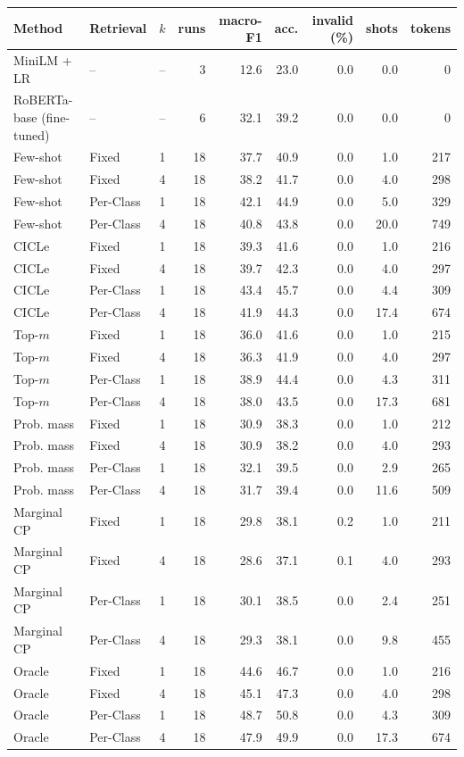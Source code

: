 \begin{tabular}{llrrrrrrr}
\toprule
Method & Retrieval & $k$ & runs & macro-F1 & acc. & invalid (\%) & shots & tokens \\
\midrule
MiniLM + LR & -- & -- & 3 & 12.6 & 23.0 & 0.0 & 0.0 & 0 \\
RoBERTa-base (fine-tuned) & -- & -- & 6 & 32.1 & 39.2 & 0.0 & 0.0 & 0 \\
\midrule
Few-shot & Fixed & 1 & 18 & 37.7 & 40.9 & 0.0 & 1.0 & 217 \\
Few-shot & Fixed & 4 & 18 & 38.2 & 41.7 & 0.0 & 4.0 & 298 \\
Few-shot & Per-Class & 1 & 18 & 42.1 & 44.9 & 0.0 & 5.0 & 329 \\
Few-shot & Per-Class & 4 & 18 & 40.8 & 43.8 & 0.0 & 20.0 & 749 \\
CICLe & Fixed & 1 & 18 & 39.3 & 41.6 & 0.0 & 1.0 & 216 \\
CICLe & Fixed & 4 & 18 & 39.7 & 42.3 & 0.0 & 4.0 & 297 \\
CICLe & Per-Class & 1 & 18 & 43.4 & 45.7 & 0.0 & 4.4 & 309 \\
CICLe & Per-Class & 4 & 18 & 41.9 & 44.3 & 0.0 & 17.4 & 674 \\
\midrule
Top-$m$ & Fixed & 1 & 18 & 36.0 & 41.6 & 0.0 & 1.0 & 215 \\
Top-$m$ & Fixed & 4 & 18 & 36.3 & 41.9 & 0.0 & 4.0 & 297 \\
Top-$m$ & Per-Class & 1 & 18 & 38.9 & 44.4 & 0.0 & 4.3 & 311 \\
Top-$m$ & Per-Class & 4 & 18 & 38.0 & 43.5 & 0.0 & 17.3 & 681 \\
Prob. mass & Fixed & 1 & 18 & 30.9 & 38.3 & 0.0 & 1.0 & 212 \\
Prob. mass & Fixed & 4 & 18 & 30.9 & 38.2 & 0.0 & 4.0 & 293 \\
Prob. mass & Per-Class & 1 & 18 & 32.1 & 39.5 & 0.0 & 2.9 & 265 \\
Prob. mass & Per-Class & 4 & 18 & 31.7 & 39.4 & 0.0 & 11.6 & 509 \\
Marginal CP & Fixed & 1 & 18 & 29.8 & 38.1 & 0.2 & 1.0 & 211 \\
Marginal CP & Fixed & 4 & 18 & 28.6 & 37.1 & 0.1 & 4.0 & 293 \\
Marginal CP & Per-Class & 1 & 18 & 30.1 & 38.5 & 0.0 & 2.4 & 251 \\
Marginal CP & Per-Class & 4 & 18 & 29.3 & 38.1 & 0.0 & 9.8 & 455 \\
Oracle & Fixed & 1 & 18 & 44.6 & 46.7 & 0.0 & 1.0 & 216 \\
Oracle & Fixed & 4 & 18 & 45.1 & 47.3 & 0.0 & 4.0 & 298 \\
Oracle & Per-Class & 1 & 18 & 48.7 & 50.8 & 0.0 & 4.3 & 309 \\
Oracle & Per-Class & 4 & 18 & 47.9 & 49.9 & 0.0 & 17.3 & 674 \\
\bottomrule
\end{tabular}
